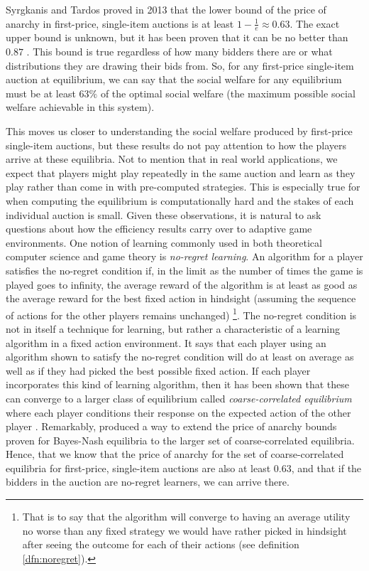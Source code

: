 \documentclass[12pt,twoside]{reedthesis}
\begin{document}
Syrgkanis and Tardos proved in 2013 that the lower bound of the price of anarchy in first-price, single-item auctions is at least $1 - \frac{1}{e} \approx 0.63$. The exact upper bound is unknown, but it has been proven that it can be no better than $0.87$ \citep{Hartline2015}. This bound is true regardless of how many bidders there are or what distributions they are drawing their bids from. So, for any first-price single-item auction at equilibrium, we can say that the social welfare for any equilibrium must be at least $63\%$ of the optimal social welfare (the maximum possible social welfare achievable in this system). 

This moves us closer to understanding the social welfare produced by first-price single-item auctions, but these results do not pay attention to how the players arrive at these equilibria. Not to mention that in real world applications, we expect that players might play repeatedly in the same auction and learn as they play rather than come in with pre-computed strategies. This is especially true for when computing the equilibrium is computationally hard and the stakes of each individual auction is small. Given these observations, it is natural to ask questions about how the efficiency results carry over to adaptive game environments. One notion of learning  commonly used in both theoretical computer science and game theory is {\em no-regret learning}. An algorithm for a player satisfies the no-regret condition if, in the limit as the number of times the game is played goes to infinity, the average reward of the algorithm is at least as good as the average reward for the best fixed action in hindsight (assuming the sequence of actions for the other players remains unchanged) \footnote{That is to say that the algorithm will converge to having an average utility no worse than any fixed strategy we would have rather picked in hindsight after seeing the outcome for each of their actions (see definition \ref{dfn:noregret}).}. The no-regret condition is not in itself a technique for learning, but rather a characteristic of a learning algorithm in a fixed action environment. It says that each player using an algorithm shown to satisfy the no-regret condition will do at least on average as well as if they had picked the best possible fixed action. If each player  incorporates this kind of learning algorithm, then it has been shown that these can converge to a larger class of equilibrium called {\em coarse-correlated equilibrium} where each player conditions their response on the expected action of the other player \citep{Blum2007}. Remarkably, \cite{Roughgarden2017}  produced a way to extend the price of anarchy bounds proven for Bayes-Nash equilibria to the larger set of coarse-correlated equilibria. Hence, that we know that the price of anarchy for the set of coarse-correlated equilibria for first-price, single-item auctions are also at least 0.63, and that if the bidders in the auction are no-regret learners, we can arrive there. 
\end{document}
